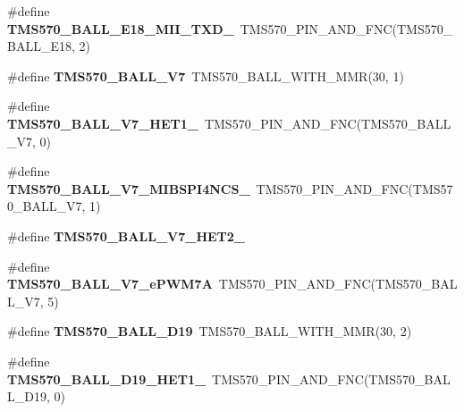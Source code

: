 \begin{DoxyCompactItemize}
\item 
\mbox{\label{tms570lc4357-pins_8h_ad040451d2711174a4d48b1dd5d9be161}} 
\#define {\bfseries T\+M\+S570\+\_\+\+B\+A\+L\+L\+\_\+\+E18\+\_\+\+M\+I\+I\+\_\+\+T\+X\+D\+\_}~T\+M\+S570\+\_\+\+P\+I\+N\+\_\+\+A\+N\+D\+\_\+\+F\+NC(T\+M\+S570\+\_\+\+B\+A\+L\+L\+\_\+\+E18, 2)
\item 
\mbox{\label{tms570lc4357-pins_8h_a81c6f39120347735dbf0d2be1fe43841}} 
\#define {\bfseries T\+M\+S570\+\_\+\+B\+A\+L\+L\+\_\+\+V7}~T\+M\+S570\+\_\+\+B\+A\+L\+L\+\_\+\+W\+I\+T\+H\+\_\+\+M\+MR(30, 1)
\item 
\mbox{\label{tms570lc4357-pins_8h_a51e3d049eacb5a81c35aca5d177e0ebb}} 
\#define {\bfseries T\+M\+S570\+\_\+\+B\+A\+L\+L\+\_\+\+V7\+\_\+\+H\+E\+T1\+\_}~T\+M\+S570\+\_\+\+P\+I\+N\+\_\+\+A\+N\+D\+\_\+\+F\+NC(T\+M\+S570\+\_\+\+B\+A\+L\+L\+\_\+\+V7, 0)
\item 
\mbox{\label{tms570lc4357-pins_8h_a41aabb5a0a5112c12d531056a7617b8d}} 
\#define {\bfseries T\+M\+S570\+\_\+\+B\+A\+L\+L\+\_\+\+V7\+\_\+\+M\+I\+B\+S\+P\+I4\+N\+C\+S\+\_}~T\+M\+S570\+\_\+\+P\+I\+N\+\_\+\+A\+N\+D\+\_\+\+F\+NC(T\+M\+S570\+\_\+\+B\+A\+L\+L\+\_\+\+V7, 1)
\item 
\#define {\bfseries T\+M\+S570\+\_\+\+B\+A\+L\+L\+\_\+\+V7\+\_\+\+H\+E\+T2\+\_}
\item 
\mbox{\label{tms570lc4357-pins_8h_a8636921c27742be769b9b4555c938172}} 
\#define {\bfseries T\+M\+S570\+\_\+\+B\+A\+L\+L\+\_\+\+V7\+\_\+e\+P\+W\+M7A}~T\+M\+S570\+\_\+\+P\+I\+N\+\_\+\+A\+N\+D\+\_\+\+F\+NC(T\+M\+S570\+\_\+\+B\+A\+L\+L\+\_\+\+V7, 5)
\item 
\mbox{\label{tms570lc4357-pins_8h_acafd61778b9bd4921d52e8a3b4f421b2}} 
\#define {\bfseries T\+M\+S570\+\_\+\+B\+A\+L\+L\+\_\+\+D19}~T\+M\+S570\+\_\+\+B\+A\+L\+L\+\_\+\+W\+I\+T\+H\+\_\+\+M\+MR(30, 2)
\item 
\mbox{\label{tms570lc4357-pins_8h_a0303ec847b041650fd18228aeb3fcdf0}} 
\#define {\bfseries T\+M\+S570\+\_\+\+B\+A\+L\+L\+\_\+\+D19\+\_\+\+H\+E\+T1\+\_}~T\+M\+S570\+\_\+\+P\+I\+N\+\_\+\+A\+N\+D\+\_\+\+F\+NC(T\+M\+S570\+\_\+\+B\+A\+L\+L\+\_\+\+D19, 0)

\end{DoxyCompactItemize}
